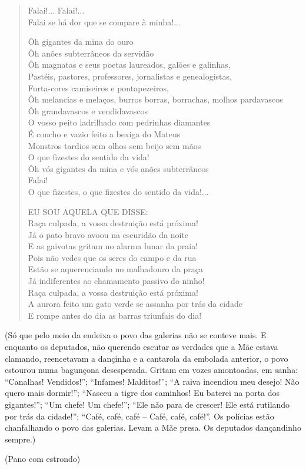 \begin{verse}
Falai!... Falai!...\\
Falai se há dor que se compare à minha!...

Ôh gigantes da mina do ouro\\
Ôh anões subterrâneos da servidão\\
Ôh magnatas e seus poetas laureados, galões e galinhas,\\
Pastéis, pastores, professores, jornalistas e genealogistas,\\
Furta-cores camiseiros e pontapezeiros,\\
Ôh melancias e melaços, burros borras, borrachas, molhos pardavascos\\
Ôh grandavascos e vendidavascos\\
O vosso peito ladrilhado com pedrinhas diamantes\\
É concho e vazio feito a bexiga do Mateus\\
Monstros tardios sem olhos sem beijo sem mãos\\
O que fizestes do sentido da vida!\\
Ôh vós gigantes da mina e vós anões subterrâneos\\
Falai!\\
O que fizestes, o que fizestes do sentido da vida!...

EU SOU AQUELA QUE DISSE:\\
Raça culpada, a vossa destruição está próxima!\\
Já o pato bravo avoou na escuridão da noite\\
E as gaivotas gritam no alarma lunar da praia!\\
Pois não vedes que os seres do campo e da rua\\
Estão se aquerenciando no malhadouro da praça\\
Já indiferentes ao chamamento passivo do ninho!\\
Raça culpada, a vossa destruição está próxima!\\
A aurora feito um gato verde se assanha por trás da cidade\\
E rompe antes do dia as barras triunfais do dia!
\end{verse}

\hfill\parbox{150pt}{
(Só que pelo meio da endeixa o povo das galerias não se conteve mais. E
enquanto os deputados, não querendo escutar as verdades que a Mãe estava
clamando, reencetavam a dançinha e a cantarola da embolada anterior, o
povo estourou numa bagunçona desesperada. Gritam em vozes amontoadas, em
sanha: ``Canalhas! Vendidos!''; ``Infames! Malditos!''; ``A raiva
incendiou meu desejo! Não quero mais dormir!''; ``Nasceu a tigre dos
caminhos! Eu baterei na porta dos gigantes!''; ``Um chefe! Um chefe!'';
``Ele não para de crescer! Ele está rutilando por trás da cidade!'';
``Café, café, café -- Café, café, café!''. Os polícias estão
chanfalhando o povo das galerias. Levam a Mãe presa. Os deputados
dançandinho sempre.)

(Pano com estrondo)
}

